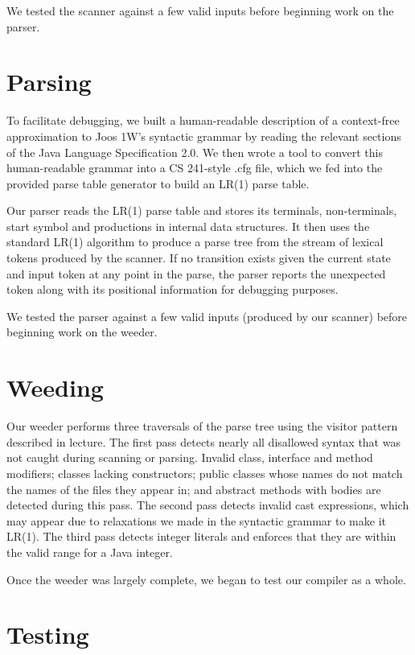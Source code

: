 \documentclass[12pt]{article}
\begin{document}
We tested the scanner against a few valid inputs before beginning work on the parser.

\section{Parsing}

To facilitate debugging, we built a human-readable description of a context-free approximation to Joos 1W's syntactic grammar by reading the relevant sections of the Java Language Specification 2.0.  We then wrote a tool to convert this human-readable grammar into a CS 241-style .cfg file, which we fed into the provided parse table generator to build an LR(1) parse table.

Our parser reads the LR(1) parse table and stores its terminals, non-terminals, start symbol and productions in internal data structures.  It then uses the standard LR(1) algorithm to produce a parse tree from the stream of lexical tokens produced by the scanner.  If no transition exists given the current state and input token at any point in the parse, the parser reports the unexpected token along with its positional information for debugging purposes.

We tested the parser against a few valid inputs (produced by our scanner) before beginning work on the weeder.

\section{Weeding}

Our weeder performs three traversals of the parse tree using the visitor pattern described in lecture.  The first pass detects nearly all disallowed syntax that was not caught during scanning or parsing.  Invalid class, interface and method modifiers; classes lacking constructors; public classes whose names do not match the names of the files they appear in; and abstract methods with bodies are detected during this pass.  The second pass detects invalid cast expressions, which may appear due to relaxations we made in the syntactic grammar to make it LR(1).  The third pass detects integer literals and enforces that they are within the valid range for a Java integer.

Once the weeder was largely complete, we began to test our compiler as a whole.

\section{Testing}
\end{document}
